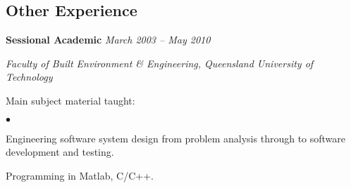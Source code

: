 \documentclass[margin,line]{resume}
\newenvironment{list1}{
  \begin{list}{}{%
      \setlength{\itemsep}{0in}
      \setlength{\parsep}{0in} \setlength{\parskip}{0in}
      \setlength{\topsep}{0in} \setlength{\partopsep}{0in}
      \setlength{\leftmargin}{0.17in}}}{\end{list}}
\newenvironment{list2}{
  \begin{list}{$\bullet$}{%
      \setlength{\itemsep}{0in}
      \setlength{\parsep}{0in} \setlength{\parskip}{0in}
      \setlength{\topsep}{0in} \setlength{\partopsep}{0in}
      \setlength{\leftmargin}{0.2in}}}{\end{list}}
\begin{document}
\begin{resume}
\section{\sc Other Experience}
{\bf Sessional Academic} \hfill {\it March 2003 -- May 2010}\\
\vspace{-0.85\baselineskip}
\begin{list1}
\item {\it Faculty of Built Environment \& Engineering, Queensland
    University of Technology}
\item Main subject material taught:
\begin{list2}
\item Engineering software system design from problem analysis through to software development and testing.
\item Programming in Matlab, C/C++.
\end{list2}
\end{list1}


\end{resume}
\end{document}
